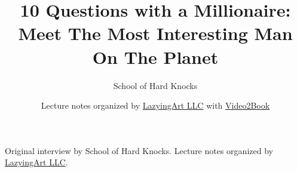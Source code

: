 \documentclass[11pt,oneside]{book}
\begin{document}
\frontmatter
\title{10 Questions with a Millionaire: Meet The Most Interesting Man On The Planet}
\author{School of Hard Knocks}
\date{Lecture notes organized by \href{https://lazying.art}{LazyingArt LLC} with \href{https://github.com/lachlanchen/Video2Book}{Video2Book}}
\maketitle
\begin{center}
\small Original interview by School of Hard Knocks. Lecture notes organized by \href{https://lazying.art}{LazyingArt LLC}.
\end{center}
\clearpage
\mainmatter

\end{document}
